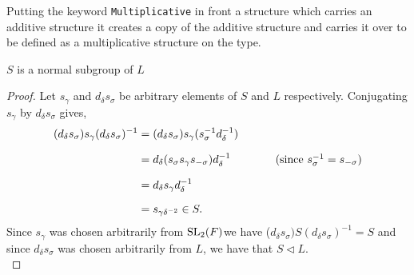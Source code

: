 \begin{remark}[Multiplicative]
    Putting the keyword \texttt{Multiplicative} in front a structure which carries an additive structure
    it creates a copy of the additive structure and carries it over to be defined as a multiplicative structure
    on the type. 
\end{remark}


\begin{lemma}
\label{SpecialSubgroups.normal_S_subgroupOf_L}
\leanok
$S$ is a normal subgroup of $L$
\end{lemma}
\begin{proof}
    \leanok
    Let $s_\gamma$ and $d_\delta s_\sigma$ be arbitrary elements of $S$ and $L$ respectively. Conjugating $s_\gamma$ by $d_\delta s_\sigma$ gives,
\begin{align*} (d_\delta s_\sigma) s_\gamma (d_\delta s_\sigma)^{-1} &= (d_\delta s_\sigma) s_\gamma (s^{-1}_\sigma d^{-1}_\delta) \\[1.5ex]
&=
d_\delta (s_\sigma s_\gamma s_{-\sigma}) d^{-1}_\delta \qquad \tag{since $s^{-1}_\sigma=s_{-\sigma}$} \\[1.5ex] 
&=
d_\delta s_\gamma d^{-1}_\delta \\[1.5ex] 
&= s_{\gamma \delta^{-2}} \in S. 
\end{align*}
Since $s_\gamma$ was chosen arbitrarily from $\operatorname{SL}_2(F)$we have ($d_\delta s_\sigma) S (d_\delta s_\sigma)^{-1} = S$ and since $d_\delta s_\sigma$ was chosen arbitrarily from $L$, we have that $S \vartriangleleft L$. \\
\end{proof}


